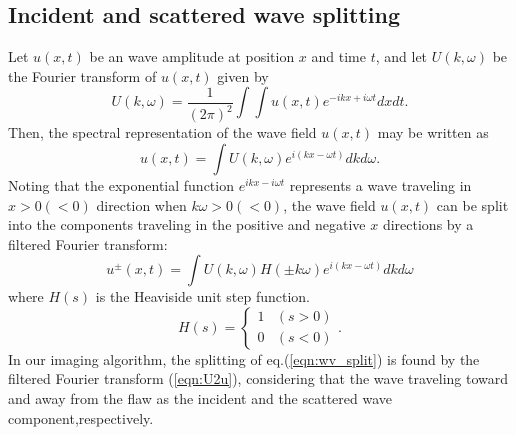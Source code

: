 ﻿\documentclass[11pt,a4j]{article}
\begin{document}
\subsection{Incident and scattered wave splitting}
Let $u(x,t)$ be an wave amplitude at position $x$ and time $t$, and let 
$U(k,\omega)$ be the Fourier transform of $u(x,t)$ given by 
\begin{equation}
	U(k,\omega)=\frac{1}{\left(2\pi\right)^2}
	\int\int u(x,t)e^{-ikx+i\omega t} dxdt.
	\label{eqn:}
\end{equation}
Then, the spectral representation of the wave field $u(x,t)$ may be written as 
\begin{equation}
	u(x,t)=\int U(k,\omega) e^{i(kx-\omega t)} dkd\omega.
	\label{eqn:U2u}
\end{equation}
Noting that the exponential function $e^{ikx-i\omega t}$ represents a wave 
traveling in $x>0(<0)$ direction when $k\omega >0(<0)$, 
the wave field $u(x,t)$ can be split into the components traveling in the 
positive and negative $x$ directions by a filtered Fourier transform:
\begin{equation}
	u^{\pm}(x,t)=\int U(k,\omega)H(\pm k\omega) e^{i(kx-\omega t)} dkd\omega
	\label{eqn:kw_filter}
\end{equation}
where $H(s)$ is the Heaviside unit step function.
\begin{equation}
	H(s)=\left\{
	\begin{array}{cc}
		1 & (s >0) \\
		0 & (s <0)
	\end{array}
	\right. .
	\label{eqn:}
\end{equation}
In our imaging algorithm, the splitting of eq.(\ref{eqn:wv_split}) is found 
by the filtered Fourier transform (\ref{eqn:U2u}), considering that the wave traveling 
toward and away from the flaw as the incident and the scattered wave component,respectively.
\end{document}
